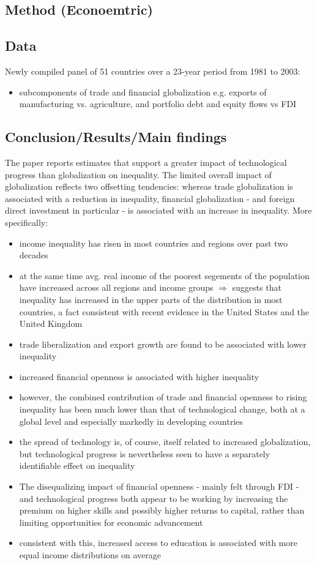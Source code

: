 \subsection{Method (Econoemtric)}
\subsection{Data}
Newly compiled panel of 51 countries over a 23-year period from 1981 to 2003:
\begin{itemize}
\item subcomponents of trade and financial globalization e.g. exports of manufacturing vs. agriculture, and portfolio debt and equity flows vs FDI
\end{itemize}
\subsection{Conclusion/Results/Main findings}
The paper reports estimates that support a greater impact of technological progress than globalization on inequality. The limited overall impact of globalization reflects two offsetting tendencies: whereas trade globalization is associated with a reduction in inequality, financial globalization - and foreign direct investment in particular - is associated with an
increase in inequality. More specifically:
\begin{itemize}
\item income inequality has risen in most countries and regions over past two decades
\item at the same time avg. real income of the poorest segements of the population have increased across all regions and income groups $\Rightarrow$ suggests that inequality has increased in the upper parts of the distribution in most countries, a fact consistent with recent evidence in the United States and the United Kingdom
\item trade liberalization and export growth are found to be associated with lower inequality
\item increased financial openness is associated with higher inequality
\item however, the combined contribution of trade and financial openness to rising inequality has been much lower than that of technological change, both at a global level and
especially markedly in developing countries
\item the spread of technology is, of course, itself related to increased globalization, but technological progress is nevertheless seen to have a separately identifiable effect on inequality
\item The disequalizing impact of financial openness - mainly felt through FDI - and technological progress both appear to be working by increasing the premium on higher skills and possibly higher returns to capital, rather than limiting opportunities for economic advancement
\item consistent with this, increased access to education is associated with more equal income distributions on average
\end{itemize}
